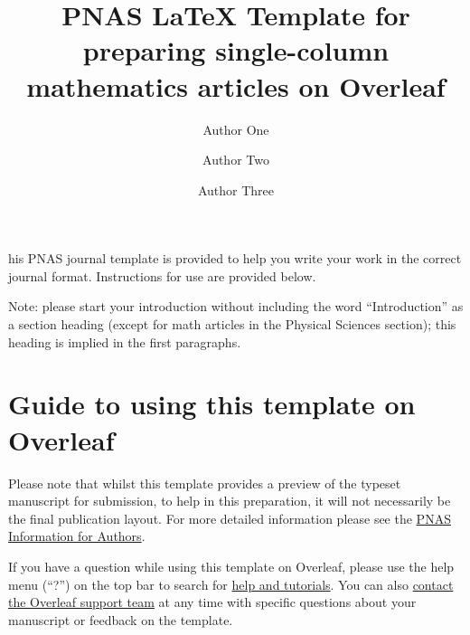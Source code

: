 \documentclass[9pt,twoside]{pnas-new}
\title{PNAS LaTeX Template for preparing single-column mathematics articles on Overleaf}
\author[a,c,1]{Author One}
\author[b,1,2]{Author Two}
\author[a]{Author Three}
\affil[a]{Affiliation One}
\affil[b]{Affiliation Two}
\affil[c]{Affiliation Three}
\begin{document}
\maketitle
\thispagestyle{firststyle}




his PNAS journal template is provided to help you write your work in the correct journal format.  Instructions for use are provided below.

Note: please start your introduction without including the word ``Introduction'' as a section heading (except for math articles in the Physical Sciences section); this heading is implied in the first paragraphs.

\section*{Guide to using this template on Overleaf}

Please note that whilst this template provides a preview of the typeset manuscript for submission, to help in this preparation, it will not necessarily be the final publication layout. For more detailed information please see the \href{https://www.pnas.org/page/authors/format}{PNAS Information for Authors}.

If you have a question while using this template on Overleaf, please use the help menu (``?'') on the top bar to search for \href{https://www.overleaf.com/help}{help and tutorials}. You can also \href{https://www.overleaf.com/contact}{contact the Overleaf support team} at any time with specific questions about your manuscript or feedback on the template.
\end{document}
